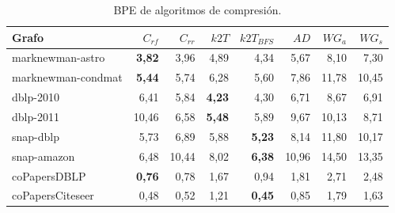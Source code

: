 \begin{table}
	\caption{BPE de algoritmos de compresión.}
	\label{table:BPEcomp}
	\centering
	\begin{tabular}{l|r|r|r|r|r|r|r}
		\toprule
		Grafo & $C_{rf}$ & $C_{rr}$ & $k2T$ & $k2T_{BFS}$ & $AD$ & $WG_{a}$ & $WG_{s}$\\
        \midrule
        marknewman-astro & \textbf{3,82} & 3,96 & 4,89 & 4,34 & 5,67 & 8,10 & 7,30\\
        marknewman-condmat & \textbf{5,44} & 5,74 & 6,28 & 5,60 & 7,86 & 11,78 & 10,45\\
        dblp-2010 & 6,41 & 5,84 & \textbf{4,23} & 4,30 & 6,71 & 8,67 & 6,91 \\
        dblp-2011 & 10,46 & 6,58 & \textbf{5,48} & 5,89 & 9,67 & 10,13 & 8,71 \\
        snap-dblp & 5,73 & 6,89 & 5,88 & \textbf{5,23} & 8,14 & 11,80 & 10,17 \\
        snap-amazon & 6,48 & 10,44 & 8,02 & \textbf{6,38} & 10,96 & 14,50 & 13,35 \\
        coPapersDBLP & \textbf{0,76} & 0,78 & 1,67 & 0,94 & 1,81 & 2,71 & 2,48 \\
        coPapersCiteseer & 0,48 & 0,52 & 1,21 & \textbf{0,45} & 0,85 & 1,79 &  1,63 \\
		\bottomrule
	\end{tabular}
\end{table}
